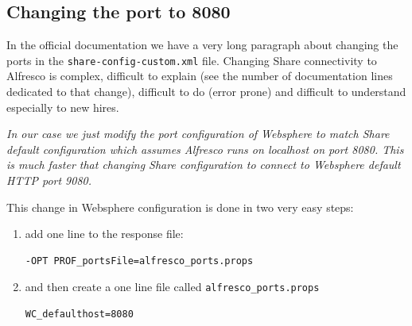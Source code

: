 \documentclass[10pt,a4]{article}
\newenvironment{faster}{{\bf {\color{red}We do it FASTER:}} \em}{\par\normalfont}%
\begin{document}





\subsection{Changing the port to 8080}
In the official documentation we have a very long paragraph about changing the ports in the {\tt share-config-custom.xml} file. Changing Share connectivity to Alfresco is complex, difficult to explain (see the number of documentation lines dedicated to that change), difficult to do (error prone) and difficult to understand especially to new hires.

\begin{faster}
In our case we just modify the port configuration of Websphere to match Share default configuration which assumes Alfresco runs on localhost on port 8080. This is much faster that changing Share configuration to connect to Websphere default HTTP port 9080.
\end{faster}

This change in Websphere configuration is done in two very easy steps:
\begin{enumerate}
\item add one line to the response file:
\begin{verbatim}
-OPT PROF_portsFile=alfresco_ports.props
\end{verbatim}
\item and then create a one line file called {\tt alfresco\_ports.props}
\begin{verbatim}
WC_defaulthost=8080
\end{verbatim}
\end{enumerate}
\end{document}

